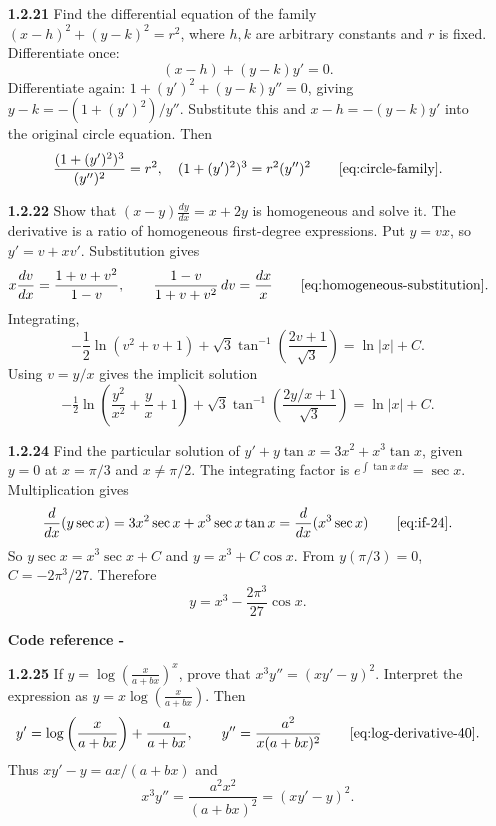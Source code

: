 \begin{enumerate}[label={},leftmargin=0pt]
\begin{enumerate}[label={},leftmargin=0pt,itemsep=9pt]
\setcounter{enumii}{21}
\setcounter{equation}{0}
\item[\textbf{1.2.21}] Find the differential equation of the family $(x-h)^2+(y-k)^2=r^2$, where $h,k$ are arbitrary constants and $r$ is fixed.
\solution Differentiate once:
\[
(x-h)+(y-k)y'=0.
\]
Differentiate again: $1+(y')^2+(y-k)y''=0$, giving $y-k=-(1+(y')^2)/y''$. Substitute this and $x-h=-(y-k)y'$ into the original circle equation. Then
\[
\frac{(1+(y')^2)^3}{(y'')^2}=r^2,
\quad(1+(y')^2)^3=r^2(y'')^2\qquad\eqref{eq:circle-family}.
\]

\setcounter{enumii}{22}
\setcounter{equation}{0}
\item[\textbf{1.2.22}] Show that $(x-y)\frac{dy}{dx}=x+2y$ is homogeneous and solve it.
\solution The derivative is a ratio of homogeneous first-degree expressions. Put $y=vx$, so $y'=v+xv'$. Substitution gives
\[
x\frac{dv}{dx}=\frac{1+v+v^2}{1-v},\qquad
\frac{1-v}{1+v+v^2}\,dv=\frac{dx}{x}\qquad\eqref{eq:homogeneous-substitution}.
\]
Integrating,
\[
-\frac12\ln(v^2+v+1)+\sqrt3\tan^{-1}\!\left(\frac{2v+1}{\sqrt3}\right)=\ln|x|+C.
\]
Using $v=y/x$ gives the implicit solution
\[
-\tfrac12\ln\!\left(\frac{y^2}{x^2}+\frac yx+1\right)+\sqrt3\tan^{-1}\!\left(\frac{2y/x+1}{\sqrt3}\right)=\ln|x|+C.
\]

\setcounter{enumii}{24}
\setcounter{equation}{0}
\item[\textbf{1.2.24}] Find the particular solution of $y'+y\tan x=3x^2+x^3\tan x$, given $y=0$ at $x=\pi/3$ and $x\ne\pi/2$.
\solution The integrating factor is $e^{\int\tan x\,dx}=\sec x$. Multiplication gives
\[
\frac{d}{dx}(y\sec x)=3x^2\sec x+x^3\sec x\tan x=\frac{d}{dx}(x^3\sec x)\qquad\eqref{eq:if-24}.
\]
So $y\sec x=x^3\sec x+C$ and $y=x^3+C\cos x$. From $y(\pi/3)=0$, $C=-2\pi^3/27$. Therefore
\[
y=x^3-\frac{2\pi^3}{27}\cos x.
\]
\par\smallskip
\noindent\textbf{Code reference -}
\par\noindent{}
\par\smallskip

\setcounter{enumii}{25}
\setcounter{equation}{0}
\item[\textbf{1.2.25}] If $y=\log\left(\frac{x}{a+bx}\right)^x$, prove that $x^3y''=(xy'-y)^2$.
\solution Interpret the expression as $y=x\log\left(\frac{x}{a+bx}\right)$. Then
\[
y'=\log\left(\frac{x}{a+bx}\right)+\frac{a}{a+bx},\qquad
 y''=\frac{a^2}{x(a+bx)^2}\qquad\eqref{eq:log-derivative-40}.
\]
Thus $xy'-y=ax/(a+bx)$ and
\[
x^3y''=\frac{a^2x^2}{(a+bx)^2}=(xy'-y)^2.
\]





\end{enumerate}
\end{enumerate}
